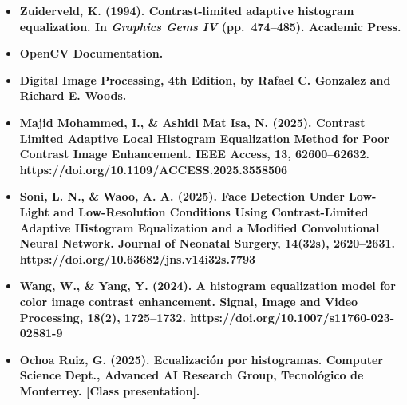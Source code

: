 \documentclass[11pt]{article}
\providecommand{\tightlist}{%
      \setlength{\itemsep}{0pt}\setlength{\parskip}{0pt}}
\begin{document}
\begin{itemize}
\tightlist
\item
  \textbf{Zuiderveld, K. (1994). Contrast-limited adaptive histogram
  equalization. In \emph{Graphics Gems IV} (pp.~474--485). Academic
  Press.}
\item
  \textbf{OpenCV Documentation.}
\item
  \textbf{Digital Image Processing, 4th Edition, by Rafael C. Gonzalez
  and Richard E. Woods.}
\item
  \textbf{Majid Mohammed, I., \& Ashidi Mat Isa, N. (2025). Contrast
  Limited Adaptive Local Histogram Equalization Method for Poor Contrast
  Image Enhancement. IEEE Access, 13, 62600--62632.
  https://doi.org/10.1109/ACCESS.2025.3558506}
\item
  \textbf{Soni, L. N., \& Waoo, A. A. (2025). Face Detection Under
  Low-Light and Low-Resolution Conditions Using Contrast-Limited
  Adaptive Histogram Equalization and a Modified Convolutional Neural
  Network. Journal of Neonatal Surgery, 14(32s), 2620--2631.
  https://doi.org/10.63682/jns.v14i32s.7793}
\item
  \textbf{Wang, W., \& Yang, Y. (2024). A histogram equalization model
  for color image contrast enhancement. Signal, Image and Video
  Processing, 18(2), 1725--1732.
  https://doi.org/10.1007/s11760-023-02881-9}
\item
  \textbf{Ochoa Ruiz, G. (2025). Ecualización por histogramas. Computer
  Science Dept., Advanced AI Research Group, Tecnológico de Monterrey.
  {[}Class presentation{]}.}
\end{itemize}


    
    
    
\end{document}
